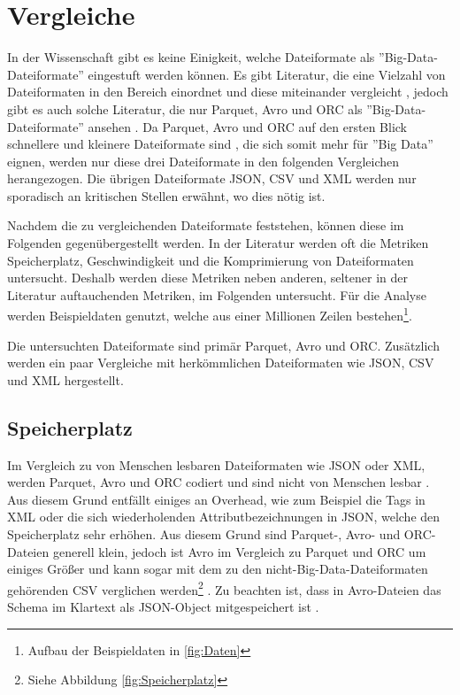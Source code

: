 \chapter{Vergleiche}

In der Wissenschaft gibt es keine Einigkeit, welche Dateiformate als ''Big-Data-Dateiformate'' eingestuft werden können. Es gibt Literatur, die eine Vielzahl von Dateiformaten in den Bereich einordnet und diese miteinander vergleicht \cite{gohil_compendious_2022} \cite{belov_experimental_2021} \cite{belov_analysis_2021}, jedoch gibt es auch solche Literatur, die nur Parquet, Avro und ORC als ''Big-Data-Dateiformate'' ansehen \cite{plase_comparison_2017}. Da Parquet, Avro und ORC auf den ersten Blick schnellere und kleinere Dateiformate sind \cite[S. 907ff.]{gohil_compendious_2022} \cite[S. 7]{belov_experimental_2021}, die sich somit mehr für ''Big Data'' eignen, werden nur diese drei Dateiformate in den folgenden Vergleichen herangezogen. Die übrigen Dateiformate JSON, CSV und XML werden nur sporadisch an kritischen Stellen erwähnt, wo dies nötig ist.

Nachdem die zu vergleichenden Dateiformate feststehen, können diese im Folgenden gegenübergestellt werden. In der Literatur werden oft die Metriken Speicherplatz, Geschwindigkeit und die Komprimierung von Dateiformaten untersucht. Deshalb werden diese Metriken neben anderen, seltener in der Literatur auftauchenden Metriken, im Folgenden untersucht. Für die Analyse werden Beispieldaten genutzt, welche aus einer Millionen Zeilen bestehen\footnote{Aufbau der Beispieldaten in \ref{fig:Daten}}.

Die untersuchten Dateiformate sind primär Parquet, Avro und ORC. Zusätzlich werden ein paar Vergleiche mit herkömmlichen Dateiformaten wie JSON, CSV und XML hergestellt.

\section{Speicherplatz}
Im Vergleich zu von Menschen lesbaren Dateiformaten wie JSON oder XML, werden Parquet, Avro und ORC codiert und sind nicht von Menschen lesbar \cite[S. 905f.]{gohil_compendious_2022}. Aus diesem Grund entfällt einiges an Overhead, wie zum Beispiel die Tags in XML oder die sich wiederholenden Attributbezeichnungen in JSON, welche den Speicherplatz sehr erhöhen. Aus diesem Grund sind Parquet-, Avro- und ORC-Dateien generell klein, jedoch ist Avro im Vergleich zu Parquet und ORC um einiges Größer und kann sogar mit dem zu den nicht-Big-Data-Dateiformaten gehörenden CSV verglichen werden\footnote{Siehe Abbildung \ref{fig:Speicherplatz}} \cite[S. 907]{gohil_compendious_2022} \cite[S. 7]{belov_experimental_2021}. Zu beachten ist, dass in Avro-Dateien das Schema im Klartext als JSON-Object mitgespeichert ist \cite[S. 338]{munir_cost-based_2020}.

